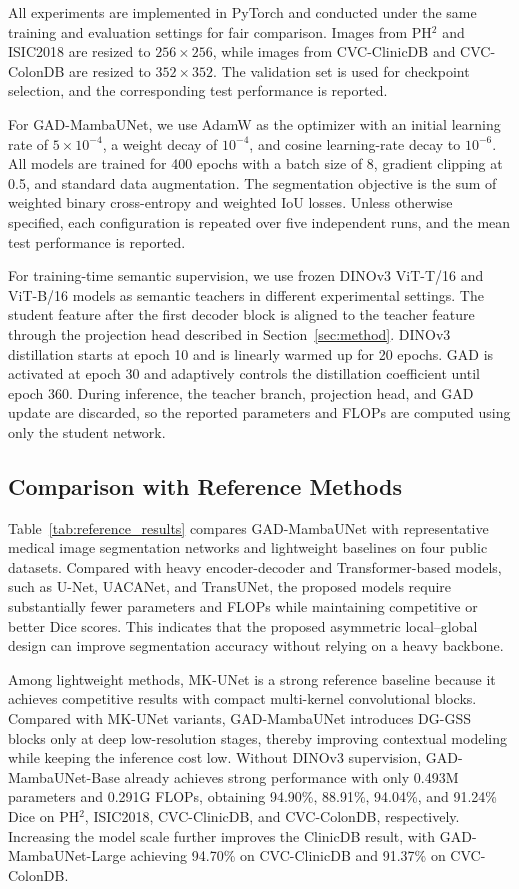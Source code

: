 All experiments are implemented in PyTorch and conducted under the same training and evaluation settings for fair comparison. Images from PH$^2$ and ISIC2018 are resized to $256\times256$, while images from CVC-ClinicDB and CVC-ColonDB are resized to $352\times352$. The validation set is used for checkpoint selection, and the corresponding test performance is reported.

For GAD-MambaUNet, we use AdamW as the optimizer with an initial learning rate of $5\times10^{-4}$, a weight decay of $10^{-4}$, and cosine learning-rate decay to $10^{-6}$. All models are trained for 400 epochs with a batch size of 8, gradient clipping at 0.5, and standard data augmentation. The segmentation objective is the sum of weighted binary cross-entropy and weighted IoU losses. Unless otherwise specified, each configuration is repeated over five independent runs, and the mean test performance is reported.




For training-time semantic supervision, we use frozen DINOv3 ViT-T/16 and ViT-B/16 models as semantic teachers in different experimental settings. The student feature after the first decoder block is aligned to the teacher feature through the projection head described in Section~\ref{sec:method}. DINOv3 distillation starts at epoch 10 and is linearly warmed up for 20 epochs. GAD is activated at epoch 30 and adaptively controls the distillation coefficient until epoch 360. During inference, the teacher branch, projection head, and GAD update are discarded, so the reported parameters and FLOPs are computed using only the student network.




\subsection{Comparison with Reference Methods}

Table~\ref{tab:reference_results} compares GAD-MambaUNet with representative medical image segmentation networks and lightweight baselines on four public datasets. Compared with heavy encoder-decoder and Transformer-based models, such as U-Net, UACANet, and TransUNet, the proposed models require substantially fewer parameters and FLOPs while maintaining competitive or better Dice scores. This indicates that the proposed asymmetric local--global design can improve segmentation accuracy without relying on a heavy backbone.

Among lightweight methods, MK-UNet is a strong reference baseline because it achieves competitive results with compact multi-kernel convolutional blocks. Compared with MK-UNet variants, GAD-MambaUNet introduces DG-GSS blocks only at deep low-resolution stages, thereby improving contextual modeling while keeping the inference cost low. Without DINOv3 supervision, GAD-MambaUNet-Base already achieves strong performance with only 0.493M parameters and 0.291G FLOPs, obtaining 94.90\%, 88.91\%, 94.04\%, and 91.24\% Dice on PH$^2$, ISIC2018, CVC-ClinicDB, and CVC-ColonDB, respectively. Increasing the model scale further improves the ClinicDB result, with GAD-MambaUNet-Large achieving 94.70\% on CVC-ClinicDB and 91.37\% on CVC-ColonDB.

